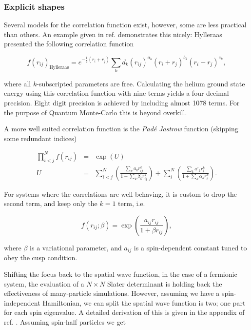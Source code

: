 \subsubsection{Explicit shapes}

Several models for the correlation function exist, however, some are less practical than others. An example given in ref. \cite{abInitioMC} demonstrates this nicely: Hylleraas presented the following correlation function 

\begin{equation}
 f(r_{ij})_\mathrm{Hylleraas} = e^{-\frac{1}{2} (r_i + r_j)}\sum_k d_k(r_{ij})^{a_k} (r_i + r_j)^{b_k}(r_i - r_j)^{e_k},
\end{equation}

where all $k$-subscripted parameters are free. Calculating the helium ground state energy using this correlation function with nine terms yields a four decimal precision. Eight digit precision is achieved by including almost 1078 terms. For the purpose of Quantum Monte-Carlo this is beyond overkill. 

A more well suited correlation function is the \textit{Padé Jastrow} function (skipping some redundant indices) 

\begin{eqnarray*}
 \prod_{i<j}^Nf(r_{ij}) &=& \exp(U) \\
         U &=&  \sum_{i<j}^N\left(\frac{\sum_k a_kr_{ij}^k}{1 + \sum_k \beta_kr_{ij}^k}\right) + \sum_i^N\left(\frac{\sum_k a'_kr_i^k}{1 + \sum_k \alpha_kr_i^k}\right).
\end{eqnarray*}

For systems where the correlations are well behaving, it is custom to drop the second term, and keep only the $k=1$ term, i.e.

\begin{equation}
 \label{eq:jastrow}
 f(r_{ij}; \beta) = \exp\left(\frac{a_{ij} r_{ij}}{1 + \beta r_{ij}}\right),
\end{equation}

where $\beta$ is a variational parameter, and $a_{ij}$ is a spin-dependent constant tuned to obey the cusp condition.

Shifting the focus back to the spatial wave function, in the case of a fermionic system, the evaluation of a $N\times N$ Slater determinant is holding back the effectiveness of many-particle simulations. However, assuming we have a spin-independent Hamiltonian, we can split the spatial wave function is two; one part for each spin eigenvalue. A detailed derivation of this is given in the appendix of ref. \cite{QMCPHD2008}. Assuming spin-half particles we get


